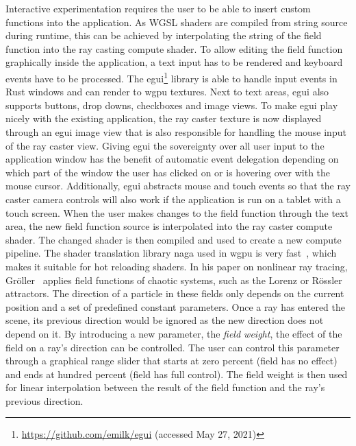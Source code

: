Interactive experimentation requires the user to be able to insert custom functions into the application.
As WGSL shaders are compiled from string source during runtime, this can be achieved by interpolating the string of the field function into the ray casting compute shader.
To allow editing the field function graphically inside the application, a text input has to be rendered and keyboard events have to be processed.
The egui\footnote{\url{https://github.com/emilk/egui} (accessed May 27, 2021)} library is able to handle input events in Rust windows and can render to wgpu textures.
Next to text areas, egui also supports buttons, drop downs, checkboxes and image views.
To make egui play nicely with the existing application, the ray caster texture is now displayed through an egui image view that is also responsible for handling the mouse input of the ray caster view.
Giving egui the sovereignty over all user input to the application window has the benefit of automatic event delegation depending on which part of the window the user has clicked on or is hovering over with the mouse cursor.
Additionally, egui abstracts mouse and touch events so that the ray caster camera controls will also work if the application is run on a tablet with a touch screen.
When the user makes changes to the field function through the text area, the new field function source is interpolated into the ray caster compute shader.
The changed shader is then compiled and used to create a new compute pipeline.
The shader translation library naga used in wgpu is very fast~\cite{malyshauShaderTranslationBenchmark2021}, which makes it suitable for hot reloading shaders.
In his paper on nonlinear ray tracing, Gröller~\cite{grollerNonlinearRayTracing1995} applies field functions of chaotic systems, such as the Lorenz or Rössler attractors.
The direction of a particle in these fields only depends on the current position and a set of predefined constant parameters.
Once a ray has entered the scene, its previous direction would be ignored as the new direction does not depend on it.
By introducing a new parameter, the \textit{field weight}, the effect of the field on a ray's direction can be controlled.
The user can control this parameter through a graphical range slider that starts at zero percent (field has no effect) and ends at hundred percent (field has full control).
The field weight is then used for linear interpolation between the result of the field function and the ray's previous direction.

